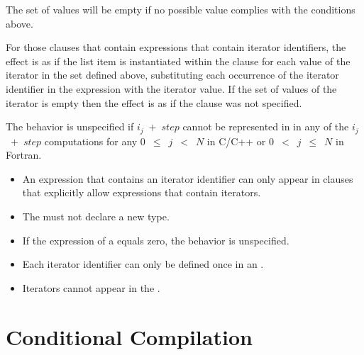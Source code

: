 The set of values will be empty if no possible value complies with the 
conditions above.

For those clauses that contain expressions that contain iterator identifiers, the
effect is as if the list item is instantiated within the clause for each value
of the iterator in the set defined above, substituting each occurrence of the
iterator identifier in the expression with the iterator value. If the set of
values of the iterator is empty then the effect is as if the clause was not
specified.

The behavior is unspecified if $i_{j}$~$+$~$step$ cannot be represented in 
 in any of the $i_{j}$~$+$~$step$ computations for any 
$0$~$\leq$~$j$~$<$~$N$ in C/C++ or $0$~$<$~$j$~$\leq$~$N$ in Fortran.

\restrictions

\begin{itemize}
\item An expression that contains an iterator identifier can only appear in 
      clauses that explicitly allow expressions that contain iterators.
\item The  must not declare a new type.
\item If the  expression of a  equals zero, 
      the behavior is unspecified.
\item Each iterator identifier can only be defined once in an 
      .
\item Iterators cannot appear in the .
\end{itemize}



\section{Conditional Compilation}
\label{sec:Conditional Compilation}

